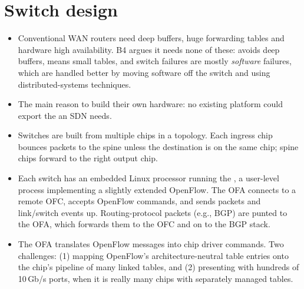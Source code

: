\section{Switch design}
\begin{itemize}
\item Conventional WAN routers need deep buffers, huge forwarding tables and hardware high availability. B4 argues it needs none of these:  avoids deep buffers,  means small tables, and switch failures are mostly \emph{software} failures, which are handled better by moving software off the switch and using distributed-systems techniques.
\item The main reason to build their own hardware: no existing platform could export the  an SDN needs.
\item Switches are built from multiple  chips in a  topology. Each ingress chip bounces packets to the spine unless the destination is on the same chip; spine chips forward to the right output chip.
\item Each switch has an embedded Linux processor running the , a user-level process implementing a slightly extended OpenFlow. The OFA connects to a remote OFC, accepts OpenFlow commands, and sends packets and link/switch events up. Routing-protocol packets (e.g., BGP) are punted to the OFA, which forwards them to the OFC and on to the BGP stack.
\item The OFA translates OpenFlow messages into chip driver commands. Two challenges: (1) mapping OpenFlow's architecture-neutral table entries onto the chip's pipeline of many linked tables, and (2) presenting  with hundreds of 10\,Gb/s ports, when it is really many chips with separately managed tables.
\end{itemize}

